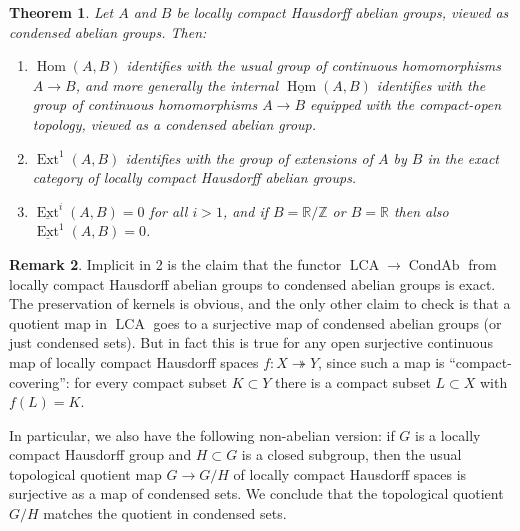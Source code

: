 \documentclass[12pt]{article}
\newtheorem{theorem}{Theorem}[section]
\theoremstyle{definition}
\newtheorem{remark}[theorem]{Remark}
\newcommand{\on}{\operatorname}
\newcommand{\mbb}{\mathbb}
\newcommand{\ul}{\underline}
\begin{document}
\begin{theorem}\label{extlchaus}
Let $A$ and $B$ be locally compact Hausdorff abelian groups, viewed as condensed abelian groups.  Then:
\begin{enumerate}
\item $\on{Hom}(A,B)$ identifies with the usual group of continuous homomorphisms $A\to B$, and more generally the internal $\ul{\on{Hom}}(A,B)$ identifies with the group of continuous homomorphisms $A \to B$ equipped with the compact-open topology, viewed as a condensed abelian group.
\item $\on{Ext}^1(A,B)$ identifies with the group of extensions of $A$ by $B$ in the exact category of locally compact Hausdorff abelian groups.
\item $\ul{\on{Ext}}^i(A,B)=0$ for all $i>1$, and if $B=\mbb{R}/\mbb{Z}$ or $B=\mbb{R}$ then also $\ul{\on{Ext}}^1(A,B)=0$.
\end{enumerate}
\end{theorem}

\begin{remark}\label{openquotient}
Implicit in 2 is the claim that the functor $\on{LCA} \to \on{CondAb}$ from locally compact Hausdorff abelian groups to condensed abelian groups is exact.  The preservation of kernels is obvious, and the only other claim to check is that a quotient map in $\on{LCA}$ goes to a surjective map of condensed abelian groups (or just condensed sets).  But in fact this is true for any open surjective continuous map of locally compact Hausdorff spaces $f:X\twoheadrightarrow Y$, since such a map is ``compact-covering'': for every compact subset $K\subset Y$ there is a compact subset $L\subset X$ with $f(L)=K$.

In particular, we also have the following non-abelian version: if $G$ is a locally compact Hausdorff group and $H\subset G$ is a closed subgroup, then the usual topological quotient map $G \to G/H$ of locally compact Hausdorff spaces is surjective as a map of condensed sets.  We conclude that the topological quotient $G/H$ matches the quotient in condensed sets.
\end{remark}
\end{document}
